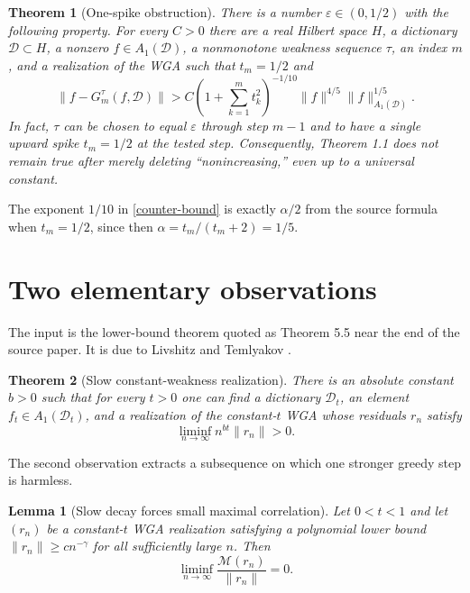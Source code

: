 \documentclass[11pt]{article}
\newtheorem{theorem}{Theorem}
\newtheorem{lemma}{Lemma}
\newcommand{\Aone}{A_1(\mathcal D)}
\newcommand{\Mcal}{\mathcal M}
\begin{document}
\begin{theorem}[One-spike obstruction]\label{main}
There is a number $\varepsilon\in(0,1/2)$ with the following property.
For every $C>0$ there are a real Hilbert space $H$, a dictionary
$\mathcal D\subset H$, a nonzero $f\in\Aone$, a nonmonotone weakness
sequence $\tau$, an index $m$, and a realization of the WGA such that
$t_m=1/2$ and
\begin{equation}\label{counter-bound}
 \|f-G_m^\tau(f,\mathcal D)\|
 > C\left(1+\sum_{k=1}^m t_k^2\right)^{-1/10}
 \|f\|^{4/5}\|f\|_{\Aone}^{1/5}.
\end{equation}
In fact, $\tau$ can be chosen to equal $\varepsilon$ through step $m-1$
and to have a single upward spike $t_m=1/2$ at the tested step.
Consequently, Theorem 1.1 does not remain true after merely deleting
``nonincreasing,'' even up to a universal constant.
\end{theorem}

The exponent $1/10$ in \eqref{counter-bound} is exactly $\alpha/2$ from the
source formula when $t_m=1/2$, since then
$\alpha=t_m/(t_m+2)=1/5$.

\section{Two elementary observations}

The input is the lower-bound theorem quoted as Theorem 5.5 near the end of
the source paper. It is due to Livshitz and Temlyakov \cite{LT}.

\begin{theorem}[Slow constant-weakness realization]\label{LTthm}
There is an absolute constant $b>0$ such that for every $t>0$ one can find
a dictionary $\mathcal D_t$, an element $f_t\in A_1(\mathcal D_t)$, and a
realization of the constant-$t$ WGA whose residuals $r_n$ satisfy
\begin{equation}\label{LTlower}
 \liminf_{n\to\infty} n^{bt}\|r_n\|>0.
\end{equation}
\end{theorem}

The second observation extracts a subsequence on which one stronger greedy
step is harmless.

\begin{lemma}[Slow decay forces small maximal correlation]\label{smallcorr}
Let $0<t<1$ and let $(r_n)$ be a constant-$t$ WGA realization satisfying a
polynomial lower bound
$\|r_n\|\geq c n^{-\gamma}$ for all sufficiently large $n$. Then
\begin{equation}\label{corrzero}
 \liminf_{n\to\infty}\frac{\Mcal(r_n)}{\|r_n\|}=0.
\end{equation}
\end{lemma}
\end{document}
